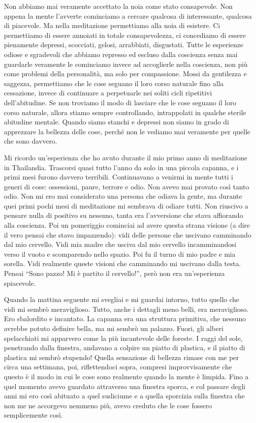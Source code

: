 Non abbiamo mai veramente accettato la noia come stato consapevole. Non
appena la mente l'avverte cominciamo a cercare qualcosa di interessante,
qualcosa di piacevole. Ma nella meditazione permettiamo alla noia di
esistere. Ci permettiamo di essere annoiati in totale consapevolezza, ci
concediamo di essere pienamente depressi, scocciati, gelosi, arrabbiati,
disgustati. Tutte le esperienze odiose e sgradevoli che abbiamo represso
ed escluso dalla coscienza senza mai guardarle veramente le cominciamo
invece ad accoglierle nella coscienza, non più come problemi della
personalità, ma solo per compassione. Mossi da gentilezza e saggezza,
permettiamo che le cose seguano il loro corso naturale fino alla
cessazione, invece di continuare a perpetuarle nei soliti cicli
ripetitivi dell'abitudine. Se non troviamo il modo di lasciare che le
cose seguano il loro corso naturale, allora stiamo sempre controllando,
intrappolati in qualche sterile abitudine mentale. Quando siamo stanchi
e depressi non siamo in grado di apprezzare la bellezza delle cose,
perché non le vediamo mai veramente per quelle che sono davvero.

Mi ricordo un'esperienza che ho avuto durante il mio primo anno di
meditazione in Thailandia. Trascorsi quasi tutto l'anno da solo in una
piccola capanna, e i primi mesi furono davvero terribili. Continuavano a
venirmi in mente tutti i generi di cose: ossessioni, paure, terrore e
odio. Non avevo mai provato così tanto odio. Non mi ero mai considerato
una persona che odiava la gente, ma durante quei primi pochi mesi di
meditazione mi sembrava di odiare tutti. Non riuscivo a pensare nulla di
positivo su nessuno, tanta era l'avversione che stava affiorando alla
coscienza. Poi un pomeriggio cominciai ad avere questa strana visione (a
dire il vero pensai che stavo impazzendo): vidi delle persone che
uscivano camminando dal mio cervello. Vidi mia madre che usciva dal mio
cervello incamminandosi verso il vuoto e scomparendo nello spazio. Poi
fu il turno di mio padre e mia sorella. Vidi realmente queste visioni
che camminando mi uscivano dalla testa. Pensai ``Sono pazzo! Mi è
partito il cervello!'', però non era un'esperienza spiacevole.

Quando la mattina seguente mi svegliai e mi guardai intorno, tutto
quello che vidi mi sembrò meraviglioso. Tutto, anche i dettagli meno
belli, era meraviglioso. Ero sbalordito e incantato. La capanna era una
struttura primitiva, che nessuno avrebbe potuto definire bella, ma mi
sembrò un palazzo. Fuori, gli alberi spelacchiati mi apparvero come la
più incantevole delle foreste. I raggi del sole, penetrando dalla
finestra, andavano a colpire un piatto di plastica, e il piatto di
plastica mi sembrò stupendo! Quella sensazione di bellezza rimase con me
per circa una settimana, poi, riflettendoci sopra, compresi
improvvisamente che questo è il modo in cui le cose sono realmente
quando la mente è limpida. Fino a quel momento avevo guardato attraverso
una finestra sporca, e col passare degli anni mi ero così abituato a
quel sudiciume e a quella sporcizia sulla finestra che non me ne
accorgevo nemmeno più, avevo creduto che le cose fossero semplicemente
così.

